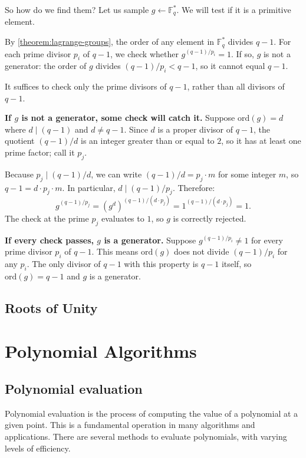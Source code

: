 So how do we find them?
Let us sample $g \leftarrow \mathbb{F}_q^*$. We will test if it is a primitive element.

By \autoref{theorem:lagrange-groups}, the order of any element in $\mathbb{F}_q^*$ divides $q-1$.
For each prime divisor $p_i$ of $q-1$, we check whether $g^{(q-1)/p_i} = 1$.
If so, $g$ is not a generator: the order of $g$ divides $(q-1)/p_i < q-1$, so it cannot equal $q-1$.


\begin{insight}
It suffices to check only the prime divisors of $q-1$, rather than all divisors of $q-1$.

\textbf{If $g$ is not a generator, some check will catch it.}
Suppose $\mathrm{ord}(g) = d$ where $d \mid (q-1)$ and $d \neq q-1$.
Since $d$ is a proper divisor of $q-1$, the quotient $(q-1)/d$ is an integer greater than or equal to $2$, so it has at least one prime factor; call it $p_j$.

Because $p_j \mid (q-1)/d$, we can write $(q-1)/d = p_j \cdot m$ for some integer $m$, so $q - 1 = d \cdot p_j \cdot m$.
In particular, $d \mid (q-1)/p_j$.
Therefore:
$$g^{(q-1)/p_j} = \left(g^{d}\right)^{(q-1)/(d \cdot p_j)} = 1^{(q-1)/(d \cdot p_j)} = 1.$$
The check at the prime $p_j$ evaluates to $1$, so $g$ is correctly rejected.

\textbf{If every check passes, $g$ is a generator.}
Suppose $g^{(q-1)/p_i} \neq 1$ for every prime divisor $p_i$ of $q-1$.
This means $\mathrm{ord}(g)$ does not divide $(q-1)/p_i$ for any $p_i$.
The only divisor of $q-1$ with this property is $q-1$ itself, so $\mathrm{ord}(g) = q-1$ and $g$ is a generator.
\end{insight}

\section{Roots of Unity}

\chapter{Polynomial Algorithms}\label{chapter:polynomial-algorithms}

\section{Polynomial evaluation}
Polynomial evaluation is the process of computing the value of a polynomial at a given point.
This is a fundamental operation in many algorithms and applications. 
There are several methods to evaluate polynomials, with varying levels of efficiency.

